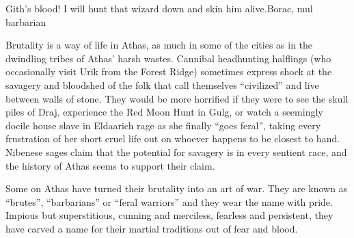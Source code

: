 {Gith's blood! I will hunt that wizard down and skin him alive.}{Borac, mul barbarian}

Brutality is a way of life in Athas, as much in some of the cities as in the dwindling tribes of Athas' harsh wastes. Cannibal headhunting halflings (who occasionally visit Urik from the Forest Ridge) sometimes express shock at the savagery and bloodshed of the folk that call themselves ``civilized'' and live between walls of stone. They would be more horrified if they were to see the skull piles of Draj, experience the Red Moon Hunt in Gulg, or watch a seemingly docile house slave in Eldaarich rage as she finally ``goes feral'', taking every frustration of her short cruel life out on whoever happens to be closest to hand. Nibenese sages claim that the potential for savagery is in every sentient race, and the history of Athas seems to support their claim.

Some on Athas have turned their brutality into an art of war. They are known as ``brutes'', ``barbarians'' or ``feral warriors'' and they wear the name with pride. Impious but superstitious, cunning and merciless, fearless and persistent, they have carved a name for their martial traditions out of fear and blood.

